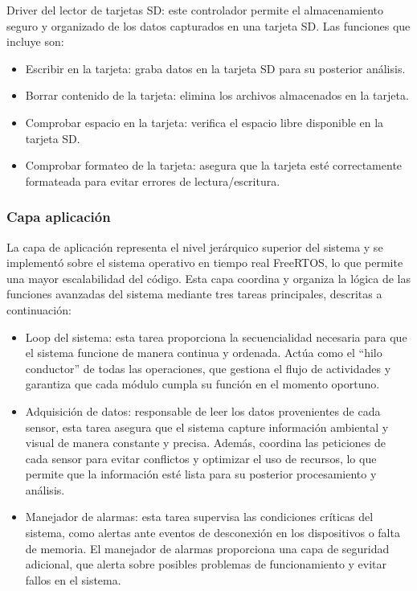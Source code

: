 Driver del lector de tarjetas SD: este controlador permite el almacenamiento seguro y organizado de los datos capturados en una tarjeta SD. Las funciones que incluye son:
\begin{itemize}
\item Escribir en la tarjeta: graba datos en la tarjeta SD para su posterior análisis.
\item Borrar contenido de la tarjeta: elimina los archivos almacenados en la tarjeta.
\item Comprobar espacio en la tarjeta: verifica el espacio libre disponible en la tarjeta SD.
\item Comprobar formateo de la tarjeta: asegura que la tarjeta esté correctamente formateada para evitar errores de lectura/escritura.
\end{itemize}

\newpage

\subsubsection{Capa aplicación}
\label{capa_aplicacion}

La capa de aplicación representa el nivel jerárquico superior del sistema y se implementó sobre el sistema operativo en tiempo real FreeRTOS, lo que permite una mayor escalabilidad del código. Esta capa coordina y organiza la lógica de las funciones avanzadas del sistema mediante tres tareas principales, descritas a continuación:

\begin{itemize}
\item Loop del sistema: esta tarea proporciona la secuencialidad necesaria para que el sistema funcione de manera continua y ordenada. Actúa como el “hilo conductor” de todas las operaciones, que gestiona el flujo de actividades y garantiza que cada módulo cumpla su función en el momento oportuno.
\item Adquisición de datos: responsable de leer los datos provenientes de cada sensor, esta tarea asegura que el sistema capture información ambiental y visual de manera constante y precisa. Además, coordina las peticiones de cada sensor para evitar conflictos y optimizar el uso de recursos, lo que permite que la información esté lista para su posterior procesamiento y análisis.
\item Manejador de alarmas: esta tarea supervisa las condiciones críticas del sistema, como alertas ante eventos de desconexión en los dispositivos o falta de memoria. El manejador de alarmas proporciona una capa de seguridad adicional, que alerta sobre posibles problemas de funcionamiento y evitar fallos en el sistema.
\end{itemize}

